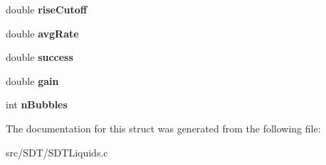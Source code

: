 \begin{DoxyCompactItemize}
\item 
\hypertarget{struct_s_d_t_fluid_flow_a3ddf467f0294073c807ab23b2344914f}{}double {\bfseries rise\+Cutoff}\label{struct_s_d_t_fluid_flow_a3ddf467f0294073c807ab23b2344914f}

\item 
\hypertarget{struct_s_d_t_fluid_flow_aeefbb2cb0cc8a54a0d1076312c3533b8}{}double {\bfseries avg\+Rate}\label{struct_s_d_t_fluid_flow_aeefbb2cb0cc8a54a0d1076312c3533b8}

\item 
\hypertarget{struct_s_d_t_fluid_flow_a4f5abfe67a6a4b6e994f7adb589ad0a1}{}double {\bfseries success}\label{struct_s_d_t_fluid_flow_a4f5abfe67a6a4b6e994f7adb589ad0a1}

\item 
\hypertarget{struct_s_d_t_fluid_flow_ac7b389a0254ed87600f959a5f6d58ab0}{}double {\bfseries gain}\label{struct_s_d_t_fluid_flow_ac7b389a0254ed87600f959a5f6d58ab0}

\item 
\hypertarget{struct_s_d_t_fluid_flow_af1b8203f0bd540d1899f412952586e3f}{}int {\bfseries n\+Bubbles}\label{struct_s_d_t_fluid_flow_af1b8203f0bd540d1899f412952586e3f}

\end{DoxyCompactItemize}


The documentation for this struct was generated from the following file\+:\begin{DoxyCompactItemize}
\item 
src/\+S\+D\+T/S\+D\+T\+Liquids.\+c\end{DoxyCompactItemize}

